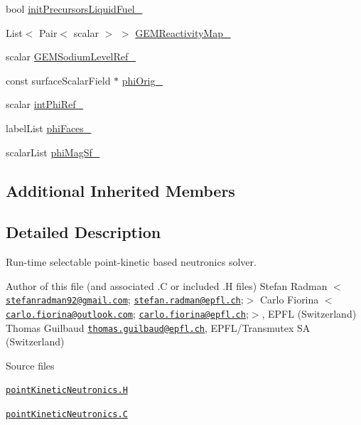 \begin{DoxyCompactItemize}
\item 
bool \hyperlink{classFoam_1_1pointKineticNeutronics_af1865d64ded87b52fa2f2bb4d2526173}{init\+Precursors\+Liquid\+Fuel\+\_\+}
\item 
List$<$ Pair$<$ scalar $>$ $>$ \hyperlink{classFoam_1_1pointKineticNeutronics_a07a380385f48dae0eb1f1b5fd3dec2c6}{G\+E\+M\+Reactivity\+Map\+\_\+}
\item 
scalar \hyperlink{classFoam_1_1pointKineticNeutronics_ae28c54106610df1cf333c8806545380c}{G\+E\+M\+Sodium\+Level\+Ref\+\_\+}
\item 
const surface\+Scalar\+Field $\ast$ \hyperlink{classFoam_1_1pointKineticNeutronics_a726eab27aa521dbf5b11104ebdd1a5e6}{phi\+Orig\+\_\+}
\item 
scalar \hyperlink{classFoam_1_1pointKineticNeutronics_a3fb9388996316fb30893d2fe383e98f4}{int\+Phi\+Ref\+\_\+}
\item 
label\+List \hyperlink{classFoam_1_1pointKineticNeutronics_ad3d8357db341cec8344bf456d650f9e2}{phi\+Faces\+\_\+}
\item 
scalar\+List \hyperlink{classFoam_1_1pointKineticNeutronics_a09a770b75cb957ca39fea01393e00e5f}{phi\+Mag\+Sf\+\_\+}
\end{DoxyCompactItemize}
\subsection*{Additional Inherited Members}


\subsection{Detailed Description}
Run-\/time selectable point-\/kinetic based neutronics solver. 

\label{_Description}%
 Author of this file (and associated .C or included .H files) Stefan Radman $<$\href{mailto:stefanradman92@gmail.com}{\tt stefanradman92@gmail.\+com}; \href{mailto:stefan.radman@epfl.ch}{\tt stefan.\+radman@epfl.\+ch};$>$ Carlo Fiorina $<$\href{mailto:carlo.fiorina@outlook.com}{\tt carlo.\+fiorina@outlook.\+com}; \href{mailto:carlo.fiorina@epfl.ch}{\tt carlo.\+fiorina@epfl.\+ch};$>$, E\+P\+FL (Switzerland) Thomas Guilbaud \href{mailto:thomas.guilbaud@epfl.ch}{\tt thomas.\+guilbaud@epfl.\+ch}, E\+P\+F\+L/\+Transmutex SA (Switzerland)

\begin{DoxyParagraph}{Source files}

\begin{DoxyItemize}
\item \href{../../../home/carlo/data/GeN-Foam/GeN-Foam_ffn/GeN-Foam/GeN-Foam/classes/neutronics/pointKinetics/pointKineticNeutronics.H}{\tt point\+Kinetic\+Neutronics.\+H} 
\item \href{../../../home/carlo/data/GeN-Foam/GeN-Foam_ffn/GeN-Foam/GeN-Foam/classes/neutronics/pointKinetics/pointKineticNeutronics.C}{\tt point\+Kinetic\+Neutronics.\+C} 
\end{DoxyItemize}
\end{DoxyParagraph}


